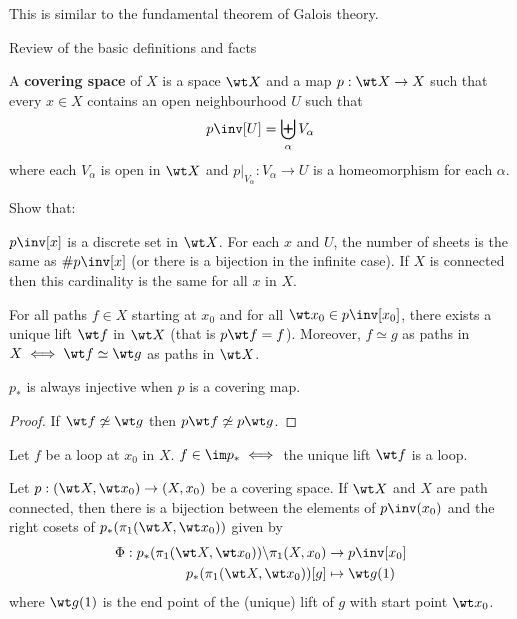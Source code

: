 \begin{rmk}
	This is similar to the fundamental theorem of Galois theory.
\end{rmk}

Review of the basic definitions and facts

\begin{defn}
	A \textbf{covering space} of $X$ is a space $\wt X$ and a map $p: \wt X \to X$ such that every $x \in X$ contains an open neighbourhood $U$ such that
	\[p\inv[U] = \biguplus_\alpha V_\alpha\]
	where each $V_\alpha$ is open in $\wt X$ and $p|_{V_\alpha}: V_\alpha \to U$ is a homeomorphism for each $\alpha$.
\end{defn}

\begin{exer}
	Show that:
	\begin{itm}
		\io $p\inv[x]$ is a discrete set in $\wt X$.
		\io For each $x$ and $U$, the number of sheets is the same as $\#p\inv[x]$ (or there is a bijection in the infinite case).
		\io If $X$ is connected then this cardinality is the same for all $x$ in $X$.
	\end{itm}
\end{exer}

\begin{prop}
	For all paths $f \in X$ starting at $x_0$ and for all $\wt x_0 \in p\inv[x_0]$, there exists a unique lift $\wt f$ in $\wt X$ (that is $p\wt f=f$).
	Moreover, $f \simeq g$ as paths in $X \iff \wt f \simeq \wt g$ as paths in $\wt X$.
\end{prop}

\begin{prop}
	$p_*$ is always injective when $p$ is a covering map.
\end{prop}

\begin{proof}
	If $\wt f \not\simeq \wt g$ then $p\wt f \not\simeq p\wt g$.
\end{proof}

\begin{exer}
	Let $f$ be a loop at $x_0$ in $X$.
	$f \in \im p_* \iff$ the unique lift $\wt f$ is a loop.
\end{exer}

\begin{prop}
	Let $p:(\wt X,\wt x_0) \to (X,x_0)$ be a covering space.
	If $\wt X$ and $X$ are path connected, then there is a bijection between the elements of $p\inv(x_0)$ and the right cosets of $p_*(\pi_1(\wt X, \wt x_0))$ given by
	\begin{align*}
		\Phi: p_*(\pi_1(\wt X,\wt x_0))\backslash\pi_1(X,x_0) &\to p\inv[x_0] \\
		p_*(\pi_1(\wt X,\wt x_0))[g] &\mapsto \wt g(1)
	\end{align*}
	where $\wt g(1)$ is the end point of the (unique) lift of $g$ with start point $\wt x_0$.
\end{prop}
